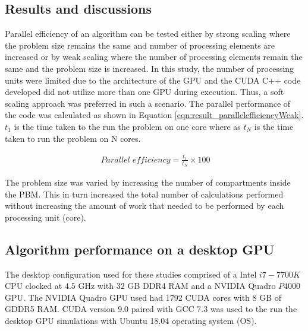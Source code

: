 \documentclass[preprint,10pt,authoryear]{elsarticle}
\begin{document}
\begin{linenumbers}
\section{Results and discussions}
\label{secResults}

Parallel efficiency of an algorithm can be tested either by strong scaling 
where the problem size remains the same and number of processing elements 
are increased or by weak scaling where the number of processing elements 
remain the same and the problem size is increased. In this study, the 
number of processing units were limited due to the architecture of the 
GPU and the CUDA C++ code developed did not utilize more than one GPU 
during execution. Thus, a soft scaling approach was preferred in such a 
scenario. The parallel performance of the code was calculated as shown in 
Equation \ref{eqn:result_parallelefficiencyWeak}. $t_1$ is the time taken 
to the run the problem on one core where as $t_N$ is the time taken to 
run the problem on N cores.

\begin{align}
\ Parallel\; efficiency = \frac{t_1}{t_N}\times 100
\label{eqn:result_parallelefficiencyWeak}
\end{align}

The problem size was varied by increasing the number of compartments inside 
the PBM. This in turn increased the total number of calculations performed 
without increasing the amount of work that needed to be performed by each 
processing unit (core).


\subsection{Algorithm performance on a desktop GPU}
The desktop configuration used for these studies comprised of a Intel $i7-7700K$  
CPU clocked at $4.5$ GHz with $32$ GB DDR4 RAM and a NVIDIA Quadro $P4000$ GPU. 
The NVIDIA Quadro GPU used had 1792 CUDA cores with 8 GB of GDDR5 RAM. 
CUDA version 9.0 paired with GCC 7.3 was used to the run the desktop GPU simulations 
with Ubuntu 18.04 operating system (OS).



\end{linenumbers}
\end{document}
